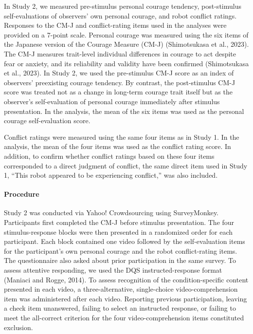 \documentclass[
]{article}
\begin{document}
In Study 2, we measured pre-stimulus personal courage tendency,
post-stimulus self-evaluations of observers' own personal courage, and
robot conflict ratings. Responses to the CM-J and conflict-rating items
used in the analyses were provided on a 7-point scale. Personal courage
was measured using the six items of the Japanese version of the Courage
Measure (CM-J) (Shimotsukasa et al., 2023). The CM-J measures
trait-level individual differences in courage to act despite fear or
anxiety, and its reliability and validity have been confirmed
(Shimotsukasa et al., 2023). In Study 2, we used the pre-stimulus CM-J
score as an index of observers' preexisting courage tendency. By
contrast, the post-stimulus CM-J score was treated not as a change in
long-term courage trait itself but as the observer's self-evaluation of
personal courage immediately after stimulus presentation. In the
analysis, the mean of the six items was used as the personal courage
self-evaluation score.

Conflict ratings were measured using the same four items as in Study 1.
In the analysis, the mean of the four items was used as the conflict
rating score. In addition, to confirm whether conflict ratings based on
these four items corresponded to a direct judgment of conflict, the same
direct item used in Study 1, ``This robot appeared to be experiencing
conflict,'' was also included.

\paragraph{Procedure}\label{procedure-1}

Study 2 was conducted via Yahoo! Crowdsourcing using SurveyMonkey.
Participants first completed the CM-J before stimulus presentation. The
four stimulus-response blocks were then presented in a randomized order
for each participant. Each block contained one video followed by the
self-evaluation items for the participant's own personal courage and the
robot conflict-rating items. The questionnaire also asked about prior
participation in the same survey. To assess attentive responding, we
used the DQS instructed-response format (Maniaci and Rogge, 2014). To
assess recognition of the condition-specific content presented in each
video, a three-alternative, single-choice video-comprehension item was
administered after each video. Reporting previous participation, leaving
a check item unanswered, failing to select an instructed response, or
failing to meet the all-correct criterion for the four
video-comprehension items constituted exclusion.
\end{document}
